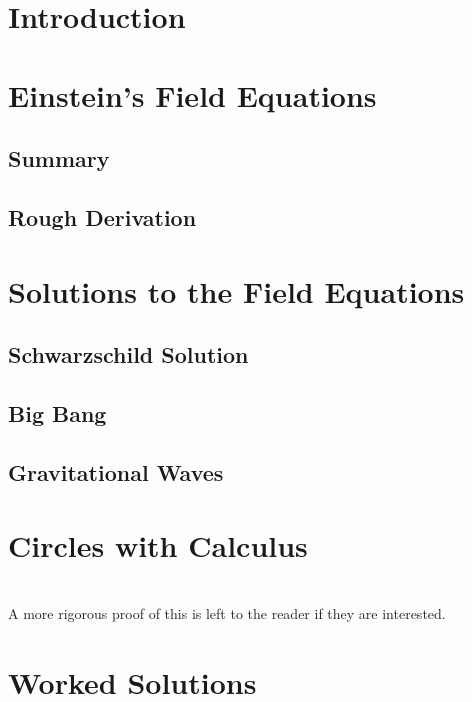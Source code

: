 \documentclass{memoir}
\begin{document}
\chapter{Introduction}

\chapter{Einstein's Field Equations}
\section{Summary}
\section{Rough Derivation}
\chapter{Solutions to the Field Equations}
\section{Schwarzschild Solution}
\section{Big Bang}
\section{Gravitational Waves}





\begin{appendices}
\chapter{Circles with Calculus}
 \\
A more rigorous proof of this is left to the reader if they are interested.
\chapter{Worked Solutions}

\end{appendices}
\end{document}
